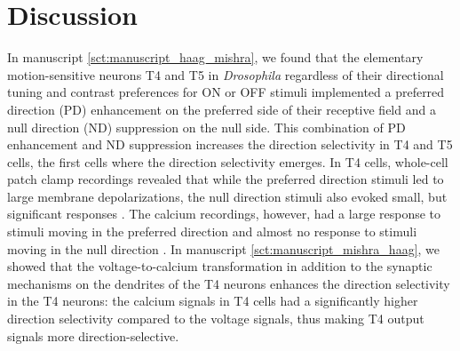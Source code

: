 \chapter{Discussion}
\label{chp:Discussion}
In manuscript \ref{sct:manuscript_haag_mishra}, we found that the elementary motion-sensitive neurons T4 and T5 in \textit{Drosophila} regardless of their directional tuning and contrast preferences for ON or OFF stimuli implemented a preferred direction (PD) enhancement on the preferred side of their receptive field and a null direction (ND) suppression on the null side. This combination of PD enhancement and ND suppression increases the direction selectivity in T4 and T5 cells, the first cells where the direction selectivity emerges. In T4 cells, whole-cell patch clamp recordings revealed that while the preferred direction stimuli led to large membrane depolarizations, the null direction stimuli also evoked small, but significant responses \parencite{Groschner2022}. The calcium recordings, however, had a large response to stimuli moving in the preferred direction and almost no response to stimuli moving in the null direction \parencite{Maisak2013, Fisher2015}. In manuscript \ref{sct:manuscript_mishra_haag}, we showed that the voltage-to-calcium transformation in addition to the synaptic mechanisms on the dendrites of the T4 neurons enhances the direction selectivity in the T4 neurons: the calcium signals in T4 cells had a significantly higher direction selectivity compared to the voltage signals, thus making T4 output signals more direction-selective.  

